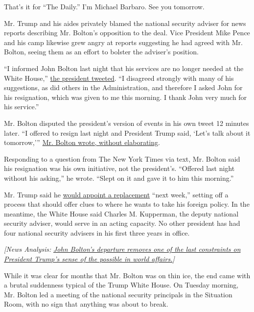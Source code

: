 That's it for ``The Daily.'' I'm Michael Barbaro. See you tomorrow.

Mr. Trump and his aides privately blamed the national security adviser
for news reports describing Mr. Bolton's opposition to the deal. Vice
President Mike Pence and his camp likewise grew angry at reports
suggesting he had agreed with Mr. Bolton, seeing them as an effort to
bolster the adviser's position.

``I informed John Bolton last night that his services are no longer
needed at the White House,''
\href{https://twitter.com/realDonaldTrump/status/1171452880055746560}{the
president tweeted}. ``I disagreed strongly with many of his suggestions,
as did others in the Administration, and therefore I asked John for his
resignation, which was given to me this morning. I thank John very much
for his service.''

Mr. Bolton disputed the president's version of events in his own tweet
12 minutes later. ``I offered to resign last night and President Trump
said, `Let's talk about it tomorrow,'''
\href{https://twitter.com/AmbJohnBolton/status/1171455806069305346}{Mr.
Bolton wrote, without elaborating}.

Responding to a question from The New York Times via text, Mr. Bolton
said his resignation was his own initiative, not the president's.
``Offered last night without his asking,'' he wrote. ``Slept on it and
gave it to him this morning.''

Mr. Trump said he
\href{https://www.nytimes3xbfgragh.onion/2019/09/10/us/john-bolton-replacement.html}{would
appoint a replacement} ``next week,'' setting off a process that should
offer clues to where he wants to take his foreign policy. In the
meantime, the White House said Charles M. Kupperman, the deputy national
security adviser, would serve in an acting capacity. No other president
has had four national security advisers in his first three years in
office.

\emph{{[}News Analysis:}
\href{https://www.nytimes3xbfgragh.onion/2019/09/10/us/politics/bolton-firing.html?action=click\&module=Intentional\&pgtype=Article}{\emph{John
Bolton's departure removes one of the last constraints on President
Trump's sense of the possible in world affairs.}}\emph{{]}}

While it was clear for months that Mr. Bolton was on thin ice, the end
came with a brutal suddenness typical of the Trump White House. On
Tuesday morning, Mr. Bolton led a meeting of the national security
principals in the Situation Room, with no sign that anything was about
to break.


